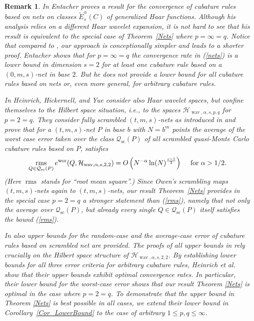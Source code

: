 \documentclass[12pt]{article}
\DeclareMathOperator{\wav}{wav}
\DeclareMathOperator{\wor}{wor}
\DeclareMathOperator{\scr}{sc}
\DeclareMathOperator{\rms}{rms}
\newtheorem{remark}{Remark}
\newcommand{\HH}{\mathcal{H}}
\begin{document}
\begin{remark}\label{Rem:Ent_HHY}
In \cite{Ent97} Entacher proves a result for the convergence of 
cubature rules based on nets on classes $\widetilde{E}^\alpha_s(C)$ of generalized Haar 
functions. Although his analysis
relies on  a different Haar wavelet expansion, it is not hard to see that his result is
equivalent to the special case of Theorem~\ref{Nets} where $p=\infty =q$. Notice that compared to \cite{Ent97}, our approach is conceptionally simpler and leads to a shorter proof.
Entacher shows that for $p=\infty= q$ the convergence rate in (\ref{nets}) is a lower bound in dimension $s=2$ for at least one cubature  rule based on a $(0,m,s)$-net in base $2$. 
But he does
not provide a lower bound for all cubature rules based on nets or, even more general, for arbitrary cubature rules.

In \cite{HHY04} Heinrich, Hickernell, and Yue consider also Haar wavelet
spaces, but confine themselves to the Hilbert space situation, i.e., to the spaces $\HH_{\wav,\alpha, s, p,q}$ for $p=2=q$.
They consider fully scrambled $(t,m,s)$-nets as introduced in \cite{Owen95} and prove that for a
$(t,m,s)$-net $P$ in base $b$ with $N=b^m$ points the average of the worst case error taken over the class $\mathcal{Q}_{\scr}(P)$ of all scrambled quasi-Monte Carlo cubature rules based on $P$, satisfies
\begin{equation}
\label{rms}
\rms_{Q\in\mathcal{Q}_{\scr}(P)} e^{\wor}(Q,\HH_{\wav,\alpha,s,2,2} )
= O \left( N^{-\alpha}\ln(N)^{\frac{s-1}{2}} \right)
\hspace{3ex}\text{for $\alpha > 1/2$.}
\end{equation}
(Here $\rms$ stands for ``root mean square''.)
Since Owen's scrambling maps $(t,m,s)$-nets again to $(t,m,s)$-nets,
our result Theorem~\ref{Nets} provides in the special case $p=2=q$ a stronger 
statement than 
(\ref{rms}), namely that not only the average
over $\mathcal{Q}_{\scr}(P)$, but already \emph{every single} %
$Q\in\mathcal{Q}_{\scr}(P)$ \emph{itself} satisfies the bound (\ref{rms}).

In \cite{HHY04} also upper bounds for the random-case and the average-case error
of cubature rules based on scrambled net are provided. The proofs of all upper bounds in \cite{HHY04} rely crucially on the Hilbert space structure of  $\HH_{\wav,\alpha, s, 2,2}$.
By establishing lower bounds for all three
error criteria for arbitrary cubature  rules, Heinrich et al. show that their upper
bounds exhibit optimal convergence rates. In particular, their lower bound for the worst-case error shows that our result Theorem \ref{Nets} is optimal in the case
where $p=2=q$. To demonstrate that the upper bound in Theorem \ref{Nets} is best possible in \emph{all cases}, we extend their lower bound in Corollary~\ref{Cor_LowerBound} to the case of arbitrary
$1\le p,q \le \infty$.
\end{remark}
\end{document}
